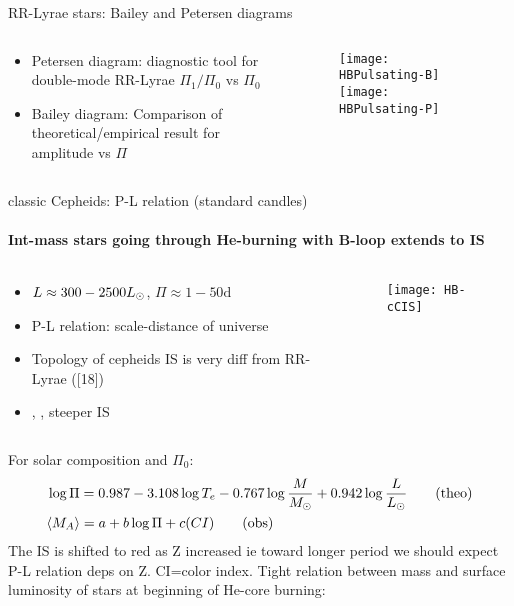 \begin{frame}{RR-Lyrae stars: Bailey and Petersen diagrams}
\begin{columns}[T]
\begin{column}{0.40\textwidth}
	\begin{itemize}
	\item Petersen diagram: diagnostic tool for double-mode RR-Lyrae $\Pi_1/\Pi_0$ vs $\Pi_0$
	\item Bailey diagram: Comparison of theoretical/empirical result for amplitude vs $\Pi$
	\end{itemize}
	\end{column}
	\begin{column}{0.60\textwidth}
	\begin{figure}[!ht]
	\texttt{[image: HBPulsating-B]}\label{fig:HBPulsating-B}
	\texttt{[image: HBPulsating-P]}\label{fig:HBPulsating-P}
	\end{figure}
\end{column}\end{columns}
\end{frame}

\begin{frame}{classic Cepheids: P-L relation (standard candles)}
    \framesubtitle{Int-mass stars going through He-burning with B-loop extends to IS}
\begin{columns}[T]
	\begin{column}{0.55\textwidth}
		\begin{itemize}
			\item $L\approx300-2500L_{\odot}$, $\Pi\approx1-50\si{\day}$
			\item P-L relation: scale-distance of universe
			\item Topology of cepheids IS is very diff from RR-Lyrae ([18])
			\item {}, , steeper IS
		\end{itemize}
	\end{column}
	\begin{column}{0.45\textwidth}
		\begin{figure}[!ht]
			\texttt{[image: HB-cCIS]}\label{fig:HB-cCIS}
		\end{figure}
\end{column}\end{columns}
For solar composition and $\Pi_0$:
\begin{align*}
    &\log{\Pi}=0.987-3.108\log{T_e}-0.767\log{\frac{M}{M_{\odot}}}+0.942\log{\frac{L}{L_{\odot}}}\tag{theo}\\
&\langle M_A \rangle=a+b\log{\Pi}+c(CI)\tag{obs}
\end{align*}
The IS is shifted to red as Z increased ie toward longer period we should expect P-L relation deps on Z.
CI=color index. Tight relation between mass and surface luminosity of stars at beginning of He-core burning:
\end{frame}

